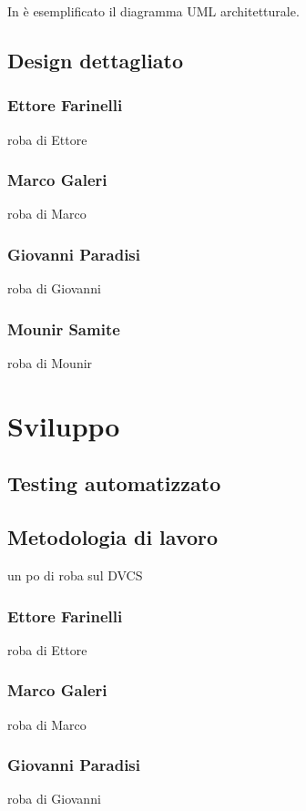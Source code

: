 \documentclass[a4paper,12pt]{report}
\begin{document}
In  è esemplificato il diagramma UML architetturale.

\section{Design dettagliato}

\subsection*{Ettore Farinelli}
roba di Ettore
\subsection*{Marco Galeri}
roba di Marco
\subsection*{Giovanni Paradisi}
roba di Giovanni
\subsection*{Mounir Samite}
roba di Mounir


\chapter{Sviluppo}

\section{Testing automatizzato}

\section{Metodologia di lavoro}
un po di roba sul DVCS

\subsection*{Ettore Farinelli}
roba di Ettore
\subsection*{Marco Galeri}
roba di Marco
\subsection*{Giovanni Paradisi}
roba di Giovanni
\end{document}
